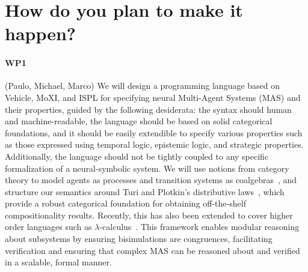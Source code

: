 \documentclass[11pt]{article}
\begin{document}
\section{How do you plan to make it happen?}




\paragraph{WP1} (Paulo, Michael, Marco)
We will design a programming language based on Vehicle, MoXI, and ISPL for
specifying neural Multi-Agent Systems (MAS) and their properties, guided by the
following desiderata: the syntax should human and machine-readable, the language
should be based on solid categorical foundations, and it should be easily
extendible to specify various properties such as those expressed using temporal logic, epistemic
logic, and strategic properties. Additionally, the language should not be
tightly coupled to any specific formalization of a neural-symbolic system.  We
will use notions from category theory to model agents as processes and
transition systems as coalgebras~\cite{Rutten00}, and structure our
semantics around Turi and Plotkin's distributive laws~\cite{TuriP97}, which provide a
robust categorical foundation for obtaining off-the-shelf compositionality
results. Recently, this has also been extended to cover higher order languages such as $\lambda$-calculus~\cite{GoncharovMSTU23}. This framework enables
modular reasoning about subsystems by ensuring bisimulations are congruences,
facilitating verification and ensuring that complex MAS can be reasoned about
and verified in a scalable, formal manner.
\end{document}
